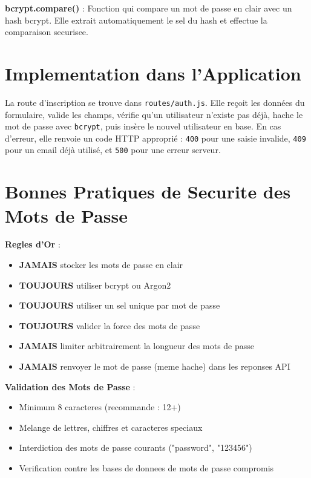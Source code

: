 \documentclass[a4paper,12pt]{book}
\begin{document}
\begin{definitionbox}
    \textbf{bcrypt.compare()} : Fonction qui compare un mot de passe en clair avec un hash bcrypt. Elle extrait automatiquement le sel du hash et effectue la comparaison securisee.
\end{definitionbox}

\section{Implementation dans l'Application}

La route d'inscription se trouve dans \texttt{routes/auth.js}. Elle reçoit les données du formulaire, valide les champs, vérifie qu'un utilisateur n'existe pas déjà, hache le mot de passe avec \texttt{bcrypt}, puis insère le nouvel utilisateur en base. En cas d'erreur, elle renvoie un code HTTP approprié : \texttt{400} pour une saisie invalide, \texttt{409} pour un email déjà utilisé, et \texttt{500} pour une erreur serveur.

\section{Bonnes Pratiques de Securite des Mots de Passe}

\begin{bestpracticebox}
    \textbf{Regles d'Or} :
    \begin{itemize}
        \item \textbf{JAMAIS} stocker les mots de passe en clair
        \item \textbf{TOUJOURS} utiliser bcrypt ou Argon2
        \item \textbf{TOUJOURS} utiliser un sel unique par mot de passe
        \item \textbf{TOUJOURS} valider la force des mots de passe
        \item \textbf{JAMAIS} limiter arbitrairement la longueur des mots de passe
        \item \textbf{JAMAIS} renvoyer le mot de passe (meme hache) dans les reponses API
    \end{itemize}
\end{bestpracticebox}

\begin{securitybox}
    \textbf{Validation des Mots de Passe} :
    \begin{itemize}
        \item Minimum 8 caracteres (recommande : 12+)
        \item Melange de lettres, chiffres et caracteres speciaux
        \item Interdiction des mots de passe courants ("password", "123456")
        \item Verification contre les bases de donnees de mots de passe compromis
    \end{itemize}
\end{securitybox}
\end{document}
